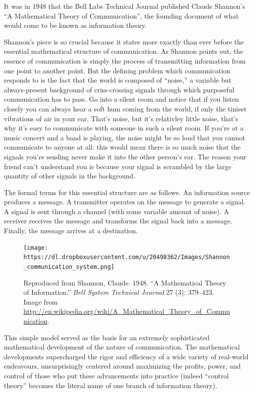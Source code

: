 \documentclass[12pt,book]{article}
\begin{document}
It was in 1948 that the Bell Labs Technical Journal published Claude
Shannon's ``A Mathematical Theory of Communication'', the founding
document of what would come to be known as information theory.

Shannon's piece is so crucial because it states more exactly than ever
before the essential mathematical structure of communication. As Shannon
points out, the essence of communication is simply the process of
transmitting information from one point to another point. But the
defining problem which communication responds to is the fact that the
world is composed of ``noise,'' a variable but always-present background
of criss-crossing signals through which purposeful communication has to
pass. Go into a silent room and notice that if you listen closely you
can always hear a soft hum coming from the world, if only the tiniest
vibrations of air in your ear. That's noise, but it's relativley little
noise, that's why it's easy to communicate with someone in such a silent
room. If you're at a music concert and a band is playing, the noise
might be so loud that you cannot communicate to anyone at all: this
would mean there is so much noise that the signals you're sending never
make it into the other person's ear. The reason your friend can't
understand you is because your signal is scrambled by the large quantity
of other signals in the background.

The formal terms for this essential structure are as follows. An
information source produces a message. A transmitter operates on the
message to generate a signal. A signal is sent through a channel (with
some variable amount of noise). A receiver receives the message and
transforms the signal back into a message. Finally, the message arrives
at a destination.

\begin{figure}[htbp]
\centering
\texttt{[image: https://dl.dropboxusercontent.com/u/20498362/Images/Shannon\_communication\_system.png]}
\caption{Reproduced from Shannon, Claude. 1948. ``A Mathematical Theory
of Information.'' \emph{Bell System Technical Journal} 27 (3): 379--423.
Image from
\url{http://en.wikipedia.org/wiki/A_Mathematical_Theory_of_Communication}.}
\end{figure}

This simple model served as the basis for an extremely sophisticated
mathematical development of the nature of communication. The
mathematical developments supercharged the rigor and efficiency of a
wide variety of real-world endeavours, unsurprisingly centered around
maximizing the profits, power, and control of those who put these
advancements into practice (indeed ``control theory'' becomes the
literal name of one branch of information theory).
\end{document}
